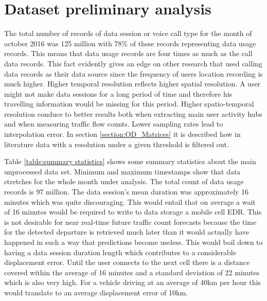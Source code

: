 \documentclass[12pt, a4paper]{report}
\theoremstyle{definition}
\theoremstyle{definition}%
\theoremstyle{definition}%
\theoremstyle{definition}%
\theoremstyle{definition}%
\theoremstyle{definition}%
\begin{document}
\section{Dataset preliminary analysis} \label{section:methodology:data_set_preliminary_analysis}

The total number of records of data session or voice call type for the month of october 2016 was 125 million with 78\% of these records representing data usage records. This means that data usage records are four times as much as the call data records. This fact evidently gives an edge on other research that used calling data records as their data source since the frequency of users location recording is much higher. Higher temporal resolution reflects higher spatial resolution. A user might not make data sessions for a long period of time and therefore his travelling information would be missing for this period.  Higher spatio-temporal resolution conduce to better results both when extracting main user activity hubs and when measuring traffic flow counts. Lower sampling rates lead to interpolation error. In section \ref{section:OD_Matrices} it is described how in literature data with a resolution under a given threshold is filtered out.

Table \ref{table:summary statistics} shows some summary statistics about the main unprocessed data set. Minimum and maximum timestamps show that data stretches for the whole month under analysis. The total count of data usage records is 97 million. The data session's mean duration was approximately 16 minutes which was quite discouraging. This would entail that on average a wait of 16 minutes would be required to write to data storage a mobile cell EDR. This is not desirable for near real-time future traffic count forecasts because the time for the detected departure is retrieved much later than it would actually have happened in such a way that predictions become useless. This would boil down to having a data session duration length which contributes to a considerable displacement error. Until the user connects to the next cell there is a distance covered within the average of 16 minutes and a standard deviation of 22 minutes which is also very high. For a vehicle driving at an average of 40km per hour this would translate to an average displacement error of 10km. 
\end{document}
